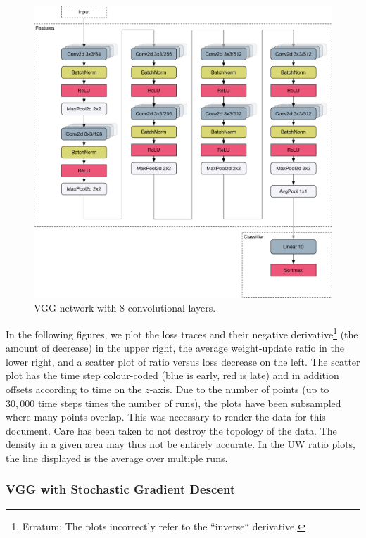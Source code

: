 \begin{figure}
    \centering
    \includegraphics[width=\linewidth]{gfx/diagrams/neural_network/vgg.pdf}
    \caption[VGG network with $8$ convolutionsl layers.]{VGG network with $8$ convolutional layers.}
    \label{fig:vgg16}
\end{figure}

In the following figures, we plot the loss traces and their negative
derivative\footnote{Erratum: The plots incorrectly refer to the ``inverse``
derivative.}
(the amount of decrease) in the upper right, the average weight-update ratio in
the lower right, and a scatter plot of ratio versus loss decrease on the left.
The scatter plot has the time step colour-coded (blue is early, red is late) and
in addition offsets according to time on the $z$-axis. Due to the number of
points (up to $30,000$ time steps times the number of runs), the plots have been
subsampled where many points overlap. This was necessary to render the data for
this document. Care has been taken to not destroy the topology of the data.  The
density in a given area may thus not be entirely accurate. In the UW ratio
plots, the line displayed is the average over multiple runs.

\subsubsection{VGG with Stochastic Gradient Descent}

